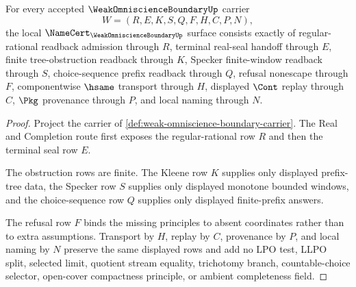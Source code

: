 \begin{theorem}
\label{thm:weak-omniscience-boundary-namecert-obligations}
For every accepted $\WeakOmniscienceBoundaryUp$ carrier
$$
W=(R,E,K,S,Q,F,H,C,P,N),
$$
the local $\NameCert_{\WeakOmniscienceBoundaryUp}$ surface consists exactly of regular-rational readback admission through $R$, terminal real-seal handoff through $E$, finite tree-obstruction readback through $K$, Specker finite-window readback through $S$, choice-sequence prefix readback through $Q$, refusal nonescape through $F$, componentwise $\hsame$ transport through $H$, displayed $\Cont$ replay through $C$, $\Pkg$ provenance through $P$, and local naming through $N$.
\end{theorem}
\begin{proof}
Project the carrier of \autoref{def:weak-omniscience-boundary-carrier}. The Real and Completion route first exposes the regular-rational row $R$ and then the terminal seal row $E$.

The obstruction rows are finite. The Kleene row $K$ supplies only displayed prefix-tree data, the Specker row $S$ supplies only displayed monotone bounded windows, and the choice-sequence row $Q$ supplies only displayed finite-prefix answers.

The refusal row $F$ binds the missing principles to absent coordinates rather than to extra assumptions. Transport by $H$, replay by $C$, provenance by $P$, and local naming by $N$ preserve the same displayed rows and add no LPO test, LLPO split, selected limit, quotient stream equality, trichotomy branch, countable-choice selector, open-cover compactness principle, or ambient completeness field.
\end{proof}

